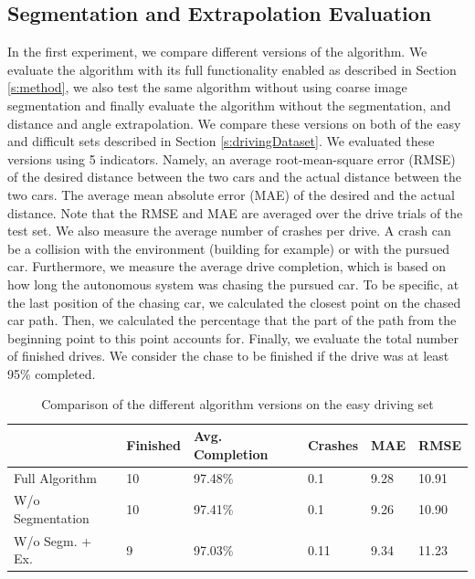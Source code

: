 \documentclass{ctuthesis/ctuthesis}
\begin{document}
\subsection{Segmentation and Extrapolation Evaluation} \label{s:experiment1}
In the first experiment, we compare different versions of the algorithm. We evaluate the algorithm with its full functionality enabled as described in Section \ref{s:method}, we also test the same algorithm without using coarse image segmentation and finally evaluate the algorithm without the segmentation, and distance and angle extrapolation. We compare these versions on both of the easy and difficult sets described in Section \ref{s:drivingDataset}. We evaluated these versions using 5 indicators. Namely, an average root-mean-square error (RMSE) of the desired distance between the two cars and the actual distance between the two cars. The average mean absolute error (MAE) of the desired and the actual distance. Note that the RMSE and MAE are averaged over the drive trials of the test set. We also measure the average number of crashes per drive. A crash can be a collision with the environment (building for example) or with the pursued car. Furthermore, we measure the average drive completion, which is based on how long the autonomous system was chasing the pursued car. To be specific, at the last position of the chasing car, we calculated the closest point on the chased car path. Then, we calculated the percentage that the part of the path from the beginning point to this point accounts for. Finally, we evaluate the total number of finished drives. We consider the chase to be finished if the drive was at least 95\% completed.\par

\begin{table}[]
\tabcolsep=0.11cm
\begin{tabular}{l|lllll}
\hline
                                      & Finished & Avg. Completion  & Crashes & MAE  & RMSE   \\ \hline
Full Algorithm                         & 10       & 97.48\% & 0.1     & 9.28 & 10.91 \\
W/o Segmentation                    & 10       & 97.41\%          & 0.1     & 9.26 & 10.90 \\
W/o Segm. + Ex. & 9        & 97.03\%          & 0.11    & 9.34 & 11.23 \\ \hline
\end{tabular}
\caption{Comparison of the different algorithm versions on the easy driving set}\label{t:easy_drives}
\end{table}
\end{document}
